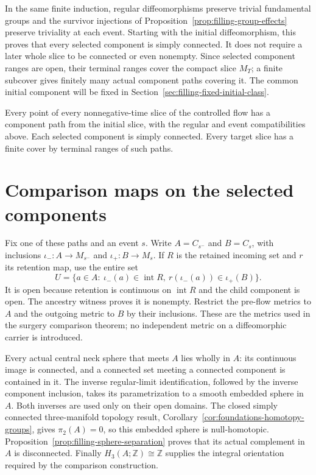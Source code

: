 In the same finite induction, regular diffeomorphisms preserve trivial
fundamental groups and the survivor injections of
Proposition~\ref{prop:filling-group-effects} preserve triviality at each
event. Starting with the initial diffeomorphism, this proves that every
selected component is simply connected. It does not require a later
whole slice to be connected or even nonempty. Since selected component
ranges are open, their terminal ranges cover the compact slice $M_T$;
a finite subcover gives finitely many actual component paths covering it.
The common initial component will be fixed in
Section~\ref{sec:filling-fixed-initial-class}.

\begin{proposition}
\label{prop:filling-component-ancestry}
Every point of every nonnegative-time slice of the controlled flow has
a component path from the initial slice, with the regular and event
compatibilities above. Each selected component is simply connected.
Every target slice has a finite cover by terminal ranges of such paths.
\end{proposition}

\section{Comparison maps on the selected components}
\label{sec:filling-ancestry-transport}

Fix one of these paths and an event $s$. Write $A=C_{s^-}$ and $B=C_s$,
with inclusions $\iota_-:A\to M_{s^-}$ and $\iota_+:B\to M_s$.
If $R$ is the retained incoming set and $r$ its retention map, use the
entire set
\[
 U=\{a\in A:\ \iota_-(a)\in\operatorname{int}R,
                   \ r(\iota_-(a))\in\iota_+(B)\}.
\]
It is open because retention is continuous on $\operatorname{int}R$
and the child component is open. The ancestry witness proves it is
nonempty. Restrict the pre-flow metrics to $A$ and the outgoing metric
to $B$ by their inclusions. These are the metrics used in the surgery
comparison theorem; no independent metric on a diffeomorphic carrier
is introduced.

Every actual central neck sphere that meets $A$ lies wholly in $A$:
its continuous image is connected, and a connected set meeting a
connected component is contained in it. The inverse regular-limit
identification, followed by the inverse component inclusion, takes its
parametrization to a smooth embedded sphere in $A$. Both inverses are
used only on their open domains. The closed simply connected
three-manifold topology result, Corollary~\ref{cor:foundations-homotopy-groups},
gives $\pi_2(A)=0$, so this embedded
sphere is null-homotopic. Proposition~\ref{prop:filling-sphere-separation}
proves that its actual complement in $A$ is disconnected. Finally
$H_3(A;\mathbb Z)\cong\mathbb Z$ supplies the integral orientation
required by the comparison construction.

